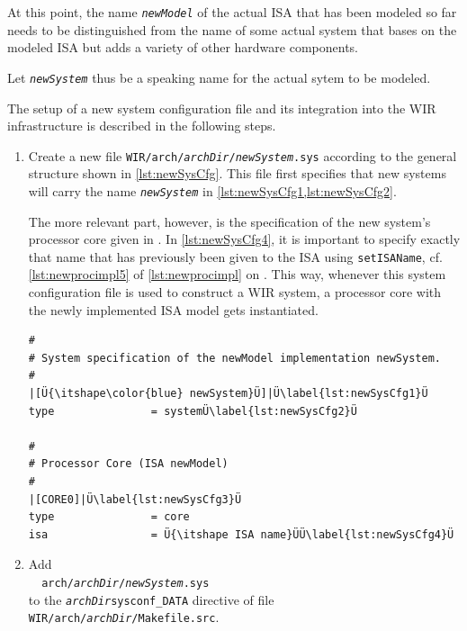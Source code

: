 \begin{wirNote}
At this point, the name \texttt{\itshape newModel} of the actual \gls{ISA} that has been modeled so far needs to be distinguished from the name of some actual system that bases on the modeled \gls{ISA} but adds a variety of other hardware components.

Let \texttt{\itshape newSystem} thus be a speaking name for the actual sytem to be modeled.
\end{wirNote}

The setup of a new system configuration file and its integration into the \gls{WIR} infrastructure is described in the following steps.

\begin{enumerate}[resume]
  \item Create a new file \texttt{WIR/arch/{\itshape archDir}/{\itshape newSystem}.sys} according to the general structure shown in \cref{lst:newSysCfg}.
  This file first specifies that new systems will carry the name \texttt{\itshape newSystem} in \cref{lst:newSysCfg1,lst:newSysCfg2}.

  The more relevant part, however, is the specification of the new system's processor core given in .
  In \cref{lst:newSysCfg4}, it is important to specify exactly that name that has previously been given to the \gls{ISA} using \texttt{setISAName}, cf. \cref{lst:newprocimpl5} of \cref{lst:newprocimpl} on .
  This way, whenever this system configuration file is used to construct a \gls{WIR} system, a processor core with the newly implemented \gls{ISA} model gets instantiated.

\begin{lstlisting}[style=commandline,float=t!,caption={Rudimentary System Configuration File},label=lst:newSysCfg]
#
# System specification of the newModel implementation newSystem.
#
|[Ü{\itshape\color{blue} newSystem}Ü]|Ü\label{lst:newSysCfg1}Ü
type               = systemÜ\label{lst:newSysCfg2}Ü

#
# Processor Core (ISA newModel)
#
|[CORE0]|Ü\label{lst:newSysCfg3}Ü
type               = core
isa                = Ü{\itshape ISA name}ÜÜ\label{lst:newSysCfg4}Ü
\end{lstlisting}

  \item Add \\
  \verb|  arch/|\texttt{\itshape archDir}\verb|/|\texttt{\itshape newSystem}\verb|.sys| \\
  to the \texttt{{\itshape archDir}sysconf\_DATA} directive of file \texttt{WIR/arch/{\itshape archDir}/Makefile.src}.


\end{enumerate}
